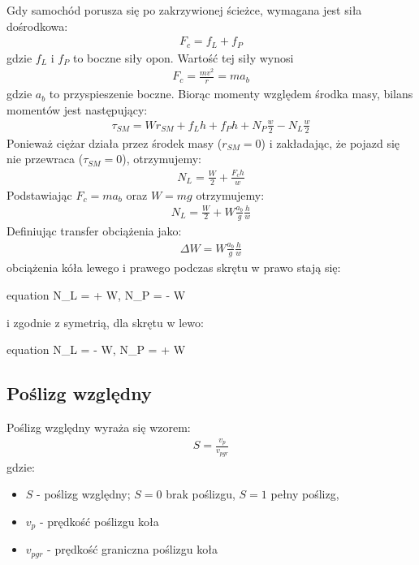 \documentclass{article}
\begin{document}
	Gdy samochód porusza się po zakrzywionej ścieżce, wymagana jest siła dośrodkowa:
	\begin{align}
		F_c=f_L+f_P
		\label{eq:centrifugal}
	\end{align}
	gdzie $f_L$ i $f_P$ to boczne siły opon. Wartość tej siły wynosi
	\begin{align}
		F_c = \frac{mv^2}{r} = ma_b
	\end{align}
	gdzie $a_b$ to przyspieszenie boczne. 
	Biorąc momenty względem środka masy, bilans momentów jest następujący:
	\begin{align}
		\tau_{SM}=Wr_{SM}+f_Lh+f_Ph+N_P\frac{w}{2}-N_L\frac{w}{2}
	\end{align}
	Ponieważ ciężar działa przez środek masy ($r_{SM}=0$) i zakładając, że pojazd się nie przewraca ($\tau_{SM}=0$), otrzymujemy:
	\begin{align}
		N_L = \frac{W}{2} + \frac{F_c h}{w}
	\end{align}
	Podstawiając $F_c = ma_b$ oraz $W=mg$ otrzymujemy:
	\begin{align}
		N_L = \frac{W}{2} + W \frac{a_b}{g}\frac{h}{w}
	\end{align}
	Definiując transfer obciążenia jako:
	\begin{align}
		\Delta W = W \frac{a_b}{g}\frac{h}{w}
	\end{align}
	obciążenia kóła lewego i prawego podczas skrętu w prawo stają się:
	\begin{empheq}[box=\fbox]{equation}
		N_L =  + \Delta W, \quad
		N_P =  - \Delta W
	\end{empheq}
	i zgodnie z symetrią, dla skrętu w lewo:
	\begin{empheq}[box=\fbox]{equation}
		N_L =  - \Delta W, \quad
		N_P =  + \Delta W
	\end{empheq}
	
	\subsection{Poślizg względny}
	Poślizg względny wyraża się wzorem:
	\begin{align}
		S=\frac{v_p}{v_{pgr}}
	\end{align}
	gdzie:
	\begin{itemize}
		\item $S$ - poślizg względny; $S=0$ brak poślizgu, $S=1$ pełny poślizg,
		\item $v_p$ - prędkość poślizgu koła
		\item $v_{pgr} $ - prędkość graniczna poślizgu koła
	\end{itemize}
\end{document}
